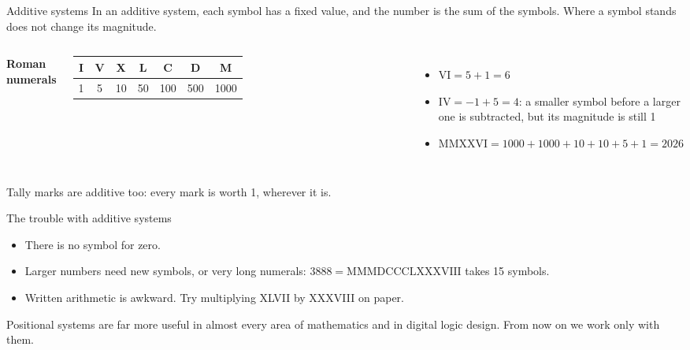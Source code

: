 \documentclass[10pt]{wosm-slides}
\begin{document}
\begin{frame}{Additive systems}
  In an additive system, each symbol has a fixed value, and the number is the sum
  of the symbols. Where a symbol stands does not change its magnitude.

  \medskip
  \begin{columns}[T, totalwidth=\textwidth]
      \textbf{Roman numerals}\par\smallskip
      \footnotesize
      \begin{tabular}{@{}*{7}{c}@{}}
        \toprule
        I & V & X & L & C & D & M \\
        \midrule
        1 & 5 & 10 & 50 & 100 & 500 & 1000 \\
        \bottomrule
      \end{tabular}
      \begin{itemize}
        \item $\mathrm{VI} = 5 + 1 = 6$
        \item $\mathrm{IV} = -1 + 5 = 4$: a smaller symbol before a larger one is
          subtracted, but its magnitude is still 1
        \item $\mathrm{MMXXVI} = 1000 + 1000 + 10 + 10 + 5 + 1 = 2026$
      \end{itemize}
  \end{columns}

  \bigskip
  Tally marks are additive too: every mark is worth 1, wherever it is.
\end{frame}

\begin{frame}{The trouble with additive systems}
  \begin{itemize}
    \item There is no symbol for zero.
    \item Larger numbers need new symbols, or very long numerals:
      $3888 = \mathrm{MMMDCCCLXXXVIII}$ takes 15 symbols.
    \item Written arithmetic is awkward. Try multiplying XLVII by XXXVIII on paper.
  \end{itemize}

  \bigskip
  \begin{remark}
    Positional systems are far more useful in almost every area of mathematics and
    in digital logic design. From now on we work only with them.
  \end{remark}
\end{frame}
\end{document}
